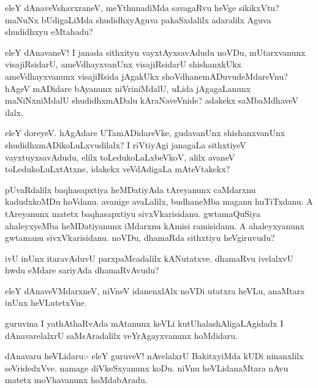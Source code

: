 \documentclass{article}
\begin{document}
\begin{mn}%
eleY dAnaveVshavxraneV, meYthunadiMda savagaRvu heVge sikikxVtu?
maNuNx bUdigaLiMda shudidhxyAguva pakaSxdalilx adaralilx Aguva
shudidhxyu eMtahadu?
\end{mn}

\begin{mn}%
eleY dAnavaneV! I janada sithxityu vayxtAyxsavAdudu noVDu,
mUtarxvanunx visajiRsidarU, ameVdhayxvanUnx visajiRsidarU shishanxkUkx
ameVdhayxvanunx visajiRsida jAgakUkx shoVdhanemADuvudeMdareVnu? hAgeV
mADidare bAyanunx niVriniMdalU, uLida jAgagaLanunx maNiNxniMdalU
shudidhxmADalu kAraNaveVnide? adakekx saMbaMdhaveV ilalx.
\end{mn}

\begin{mn}%
eleY doreyeV. hAgAdare UTamADidareVke, gudavanUnx shishanxvanUnx
shudidhxmADikoLuLxvudilalx? I riVtiyAgi janagaLa sithxtiyeV
vayxtuyxsavAdudu, elilx toLedukoLaLxbeVkoV, alilx avaneV
toLedukoLuLxtAtxne, idakekx veVdAdigaLa mAteVtakekx?
\end{mn}

\begin{mn}%
pUvaRdalilx baqhasapxtiya heMDatiyAda tAreyanunx caMdarxnu kadudxkoMDu
hoVdanu. avanige avaLalilx, budhaneMba maganu huTiTxdanu. A tAreyanunx
matetx baqhasapxtiyu sivxVkarisidanu. gwtamaQuSiya ahaleyxyeMba
heMDatiyanunx iMdarxnu kAmisi ramisidanu. A ahaleyxyanunx gwtamanu
sivxVkarisidanu. noVDu, dhamaRda sithxtiyu heVgiruvudu?
\end{mn}

\begin{mn}
ivU inUnx itaravAduvU parxpaMcadalilx kANutatxve. dhamaRvu ivelalxvU
hwdu eMdare sariyAda dhamaRvAvudu?
\end{mn}

\begin{mn}%
eleY dAnaveVMdarxneV, niVneV idanenxlAlx noVDi utatxra heVLu, anaMtara
inUnx heVLutetxVne.
\end{mn}

\begin{mn}
guruvina I yathAthaRvAda mAtanunx keVLi kutUhalashAligaLAgidadx I
dAnavarelalxrU saMsAradalilx veYrAgayxvanunx hoMdidaru.
\end{mn}

\begin{mn}%
dAnavaru heVLidaru:- eleY guruveV! nAvelalxrU BakitxyiMda kUDi
ninanxlilx seVridedxVve. namage diVkeSxyanunx koDu. niVnu
heVLidanaMtara nAvu matetx moVhavanunx hoMdabAradu.
\end{mn}
\end{document}
